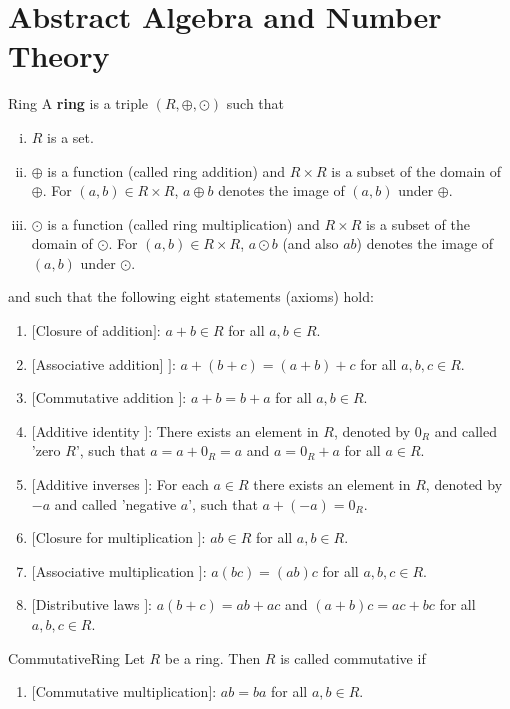 \chapter{Abstract Algebra and Number Theory}
\thispagestyle{fancy}
\begin{defn}[Ring]{Ring}
	A \textbf{ring} is a triple $(R,\oplus, \odot)$ such that
	\begin{enumerate}[(i)]
		\item $R$ is a set.
		\item $\oplus$ is a function (called ring addition) and $R\times R$ is a subset of the domain of $\oplus$. For $(a, b) \in
		R \times R$, $a \oplus b$ denotes the image of $(a, b)$ under $\oplus$.
		\item $\odot$ is a function (called ring multiplication) and $R \times R$ is a subset of the domain of $\odot$. For
		$(a, b) \in R \times R$, $a \odot b$ (and also $ab$) denotes the image of $(a, b)$ under $\odot$.
	\end{enumerate} 
	and such that the following eight statements (axioms) hold:
	\begin{enumerate}[(1)]
		\item $[$Closure of addition$]$: $a + b \in R$ for all $a, b \in R$.
		\item $[$Associative addition] $]$: $a+(b+c)=(a+b)+c$ for all $a,b,c \in R$. 
		\item $[$Commutative addition $]$: $a+b = b+a$ for all $a,b \in R$.
		\item $[$Additive identity $]$: There exists an element in 
		$R$, denoted by $0_R$ and called 'zero $R$',
		such that $a = a + 0_R = a$ and $a = 0_R + a$ for all $a \in R$.
		\item $[$Additive inverses $]$: For each $a \in R$ there exists an element in $R$, denoted by $-a$ and called 'negative $a$', such that $a+(-a)=0_R$.
		\item $[$Closure for multiplication $]$: $ab \in R$ for all $a,b \in R$.
		\item $[$Associative multiplication $]$: $a(bc)=(ab)c$ for all $a,b,c \in R$.
		\item $[$Distributive laws $]$: $a(b+c)=ab+ac$ and $(a+b)c = ac+bc$ for all $a,b,c \in R$.
	\end{enumerate}
\end{defn}
\begin{defn}{CommutativeRing}
	Let $R$ be a ring. Then $R$ is called commutative if
	\begin{enumerate}[(9)]
		\item $[$Commutative multiplication$]$: $ab=ba$ for all $a,b \in R$.
	\end{enumerate}
\end{defn}
